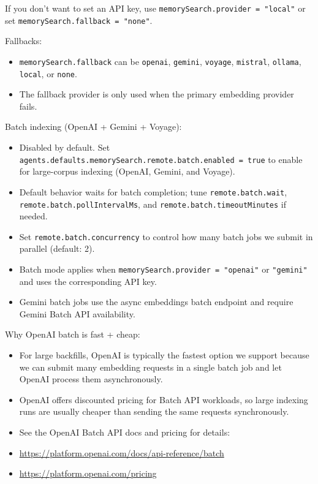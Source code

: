 If you don't want to set an API key, use \texttt{memorySearch.provider = "local"} or set
\texttt{memorySearch.fallback = "none"}.

Fallbacks:

\begin{itemize}
  \item \texttt{memorySearch.fallback} can be \texttt{openai}, \texttt{gemini}, \texttt{voyage}, \texttt{mistral}, \texttt{ollama}, \texttt{local}, or \texttt{none}.
  \item The fallback provider is only used when the primary embedding provider fails.
\end{itemize}


Batch indexing (OpenAI + Gemini + Voyage):

\begin{itemize}
  \item Disabled by default. Set \texttt{agents.defaults.memorySearch.remote.batch.enabled = true} to enable for large-corpus indexing (OpenAI, Gemini, and Voyage).
  \item Default behavior waits for batch completion; tune \texttt{remote.batch.wait}, \texttt{remote.batch.pollIntervalMs}, and \texttt{remote.batch.timeoutMinutes} if needed.
  \item Set \texttt{remote.batch.concurrency} to control how many batch jobs we submit in parallel (default: 2).
  \item Batch mode applies when \texttt{memorySearch.provider = "openai"} or \texttt{"gemini"} and uses the corresponding API key.
  \item Gemini batch jobs use the async embeddings batch endpoint and require Gemini Batch API availability.
\end{itemize}


Why OpenAI batch is fast + cheap:

\begin{itemize}
  \item For large backfills, OpenAI is typically the fastest option we support because we can submit many embedding requests in a single batch job and let OpenAI process them asynchronously.
  \item OpenAI offers discounted pricing for Batch API workloads, so large indexing runs are usually cheaper than sending the same requests synchronously.
  \item See the OpenAI Batch API docs and pricing for details:
  \item \href{https://platform.openai.com/docs/api-reference/batch}{https://platform.openai.com/docs/api-reference/batch}
  \item \href{https://platform.openai.com/pricing}{https://platform.openai.com/pricing}
\end{itemize}


